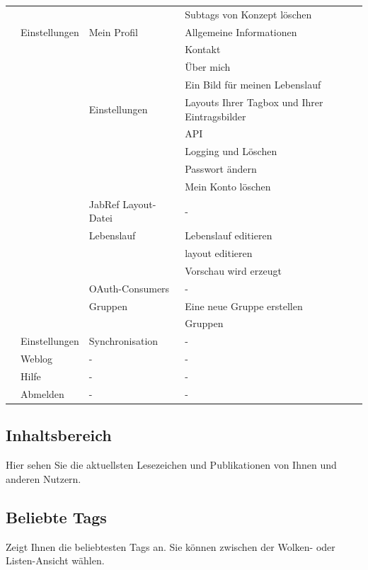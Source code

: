 \begin{longtabu}{|X|X|X|X|}
&&&Subtags von Konzept löschen\\ 
&Einstellungen&Mein Profil&Allgemeine Informationen\\ 
&&&Kontakt\\ 
&&&Über mich\\ 
&&&Ein Bild für meinen Lebenslauf\\
&&Einstellungen&Layouts Ihrer Tagbox und Ihrer Eintragsbilder\\
&&&API\\
&&&Logging und Löschen\\
&&&Passwort ändern\\
&&&Mein Konto löschen\\
&&JabRef Layout-Datei&-\\
&&Lebenslauf& Lebenslauf editieren\\
&&&layout editieren\\ 
&&&Vorschau wird erzeugt\\
&&OAuth-Consumers&- \\
&&Gruppen&Eine neue Gruppe erstellen\\
&&&Gruppen\\
&Einstellungen&Synchronisation&-\\
&Weblog&-&-\\
&Hilfe&-&-\\
&Abmelden&-&-\\\hline
\end{longtabu}

\subsection{Inhaltsbereich}
Hier sehen Sie die aktuellsten Lesezeichen und Publikationen von Ihnen und anderen Nutzern. 
\subsection{Beliebte Tags}
Zeigt Ihnen die beliebtesten Tags an. Sie können zwischen der Wolken- oder Listen-Ansicht wählen.
